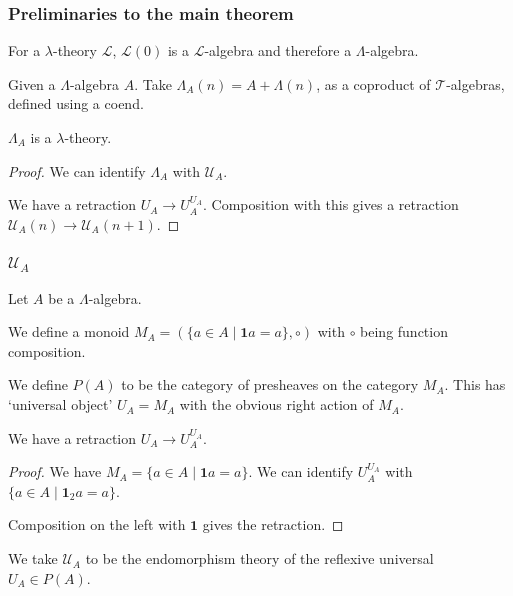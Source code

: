 \documentclass[aspectratio=169]{fancyslides} %
\begin{document}
  \begin{frame}
    \frametitle{Preliminaries to the main theorem}

    For a $ \lambda $-theory $ \mathcal L $, $ \mathcal L(0) $ is a $ \mathcal L $-algebra and therefore a $ \Lambda $-algebra.

    \vfill
    \pause

    Given a $ \Lambda $-algebra $ A $. Take $ \Lambda_A(n) = A + \Lambda(n) $, as a coproduct of $ \mathcal T $-algebras, defined using a coend.

    \vfill
    \pause
    
    \begin{lemma}
      $ \Lambda_A $ is a $ \lambda $-theory.
    \end{lemma}
    \begin{proof}
      We can identify $ \Lambda_A $ with $ \mathcal U_A $.

      We have a retraction $ U_A \to U_A^{U_A} $. Composition with this gives a retraction $ \mathcal U_A(n) \to \mathcal U_A(n + 1) $. 
    \end{proof}
  \end{frame}

  \begin{frame}
    \frametitle{$ \mathcal U_A $}
    Let $ A $ be a $ \Lambda $-algebra.

    \begin{definition}
      We define a monoid $ M_A = (\{ a \in A \mid \mathbf 1 a = a \}, \circ) $ with $ \circ $ being function composition.
    \end{definition}
    
    \pause
    \vfill

    \begin{definition}
      We define $ P(A) $ to be the category of presheaves on the category $ M_A $. This has `universal object' $ U_A = M_A $ with the obvious right action of $ M_A $.
    \end{definition}
    
    \pause
    \vfill

    \begin{lemma}
      We have a retraction $ U_A \to U_A^{U_A} $.
    \end{lemma}
    \begin{proof}
      We have $ M_A = \{ a \in A \mid \mathbf 1 a = a \} $. We can identify $ U_A^{U_A} $ with $ \{ a \in A \mid \mathbf 1_2 a = a \} $.

      Composition on the left with $ \mathbf 1 $ gives the retraction.
    \end{proof}
    
    \pause
    \vfill

    \begin{definition}
      We take $ \mathcal U_A $ to be the endomorphism theory of the reflexive universal $ U_A \in P(A) $.
    \end{definition}
  \end{frame}
\end{document}
